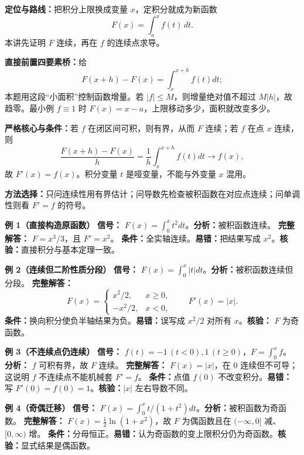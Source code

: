 
\par

\begin{knowledgeBox}
\textbf{定位与路线：}把积分上限换成变量 \(x\)，定积分就成为新函数
\[
F(x)=\int_a^x f(t)\,dt.
\]
本讲先证明 \(F\) 连续，再在 \(f\) 的连续点求导。

\textbf{直接前置四要素桥：}给
\[
F(x+h)-F(x)=\int_x^{x+h}f(t)dt;
\]
本题用这段“小面积”控制函数增量。若 \(|f|\le M\)，则增量绝对值不超过 \(M|h|\)，故趋零。最小例 \(f\equiv1\) 时 \(F(x)=x-a\)，上限移动多少，面积就改变多少。

\textbf{严格核心与条件：}若 \(f\) 在闭区间可积，则有界，从而 \(F\) 连续；若 \(f\) 在点 \(x\) 连续，则
\[
\frac{F(x+h)-F(x)}h=\frac1h\int_x^{x+h}f(t)dt\to f(x),
\]
故 \(F'(x)=f(x)\)。积分变量 \(t\) 是哑变量，不能与外变量 \(x\) 混用。

\textbf{方法选择：}只问连续性用有界估计；问导数先检查被积函数在对应点连续；问单调性则看 \(F'=f\) 的符号。

\textbf{例 1（直接构造原函数）}\quad
\textbf{信号：} \(F(x)=\int_0^xt^2dt\)。\textbf{分析：}被积函数连续。
\textbf{完整解答：} \(F=x^3/3\)，且 \(F'=x^2\)。
\textbf{条件：}全实轴连续。\textbf{易错：}把结果写成 \(x^2\)。\textbf{核验：}直接积分与基本定理一致。

\textbf{例 2（连续但二阶性质分段）}\quad
\textbf{信号：} \(F(x)=\int_0^x|t|dt\)。\textbf{分析：}被积函数连续但分段。
\textbf{完整解答：}
\[
F(x)=\begin{cases}x^2/2,&x\ge0,\\-x^2/2,&x<0,\end{cases}
\qquad F'(x)=|x|.
\]
\textbf{条件：}换向积分使负半轴结果为负。\textbf{易错：}误写成 \(x^2/2\) 对所有 \(x\)。\textbf{核验：} \(F\) 为奇函数。

\textbf{例 3（不连续点仍连续）}\quad
\textbf{信号：} \(f(t)=-1\,(t<0),1\,(t\ge0)\)，\(F=\int_0^xf\)。
\textbf{分析：} \(f\) 可积有界，故 \(F\) 连续。
\textbf{完整解答：} \(F(x)=|x|\)，在 \(0\) 连续但不可导；这说明 \(f\) 不连续点不能机械套 \(F'=f\)。
\textbf{条件：}点值 \(f(0)\) 不改变积分。\textbf{易错：}写 \(F'(0)=f(0)=1\)。\textbf{核验：}\(|x|\) 左右导数不同。

\textbf{例 4（奇偶迁移）}\quad
\textbf{信号：} \(F(x)=\int_0^x t/(1+t^2)dt\)。\textbf{分析：}被积函数为奇函数。
\textbf{完整解答：} \(F(x)=\frac12\ln(1+x^2)\)，故 \(F\) 为偶函数且在 \((-\infty,0]\) 减、\([0,\infty)\) 增。
\textbf{条件：}分母恒正。\textbf{易错：}认为奇函数的变上限积分仍为奇函数。\textbf{核验：}显式结果是偶函数。


\end{knowledgeBox}
